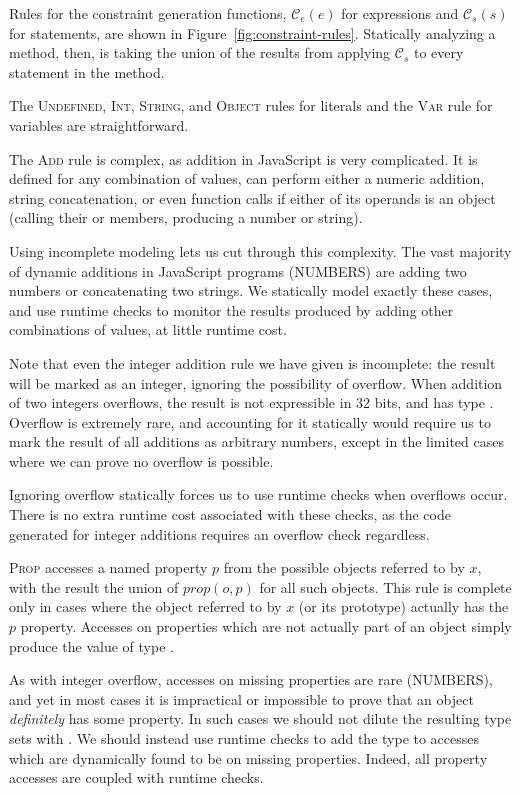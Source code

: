 Rules for the constraint generation functions, $\mathcal{C}_e(e)$ for
expressions and $\mathcal{C}_s(s)$ for statements, are shown in
Figure~\ref{fig:constraint-rules}. Statically analyzing a method, then, is
taking the union of the results from applying $\mathcal{C}_s$ to every
statement in the method.

The \textsc{Undefined}, \textsc{Int}, \textsc{String}, and \textsc{Object}
rules for literals and the \textsc{Var} rule for variables are
straightforward.

The \textsc{Add} rule is complex, as addition in JavaScript is very complicated. It is
defined for any combination of values, can perform either a numeric addition,
string concatenation, or even function calls if either of its operands is an
object (calling their  or  members, producing a
number or string).

Using incomplete modeling lets us cut through this complexity. The vast
majority of dynamic additions in JavaScript programs (NUMBERS) are adding two
numbers or concatenating two strings. We statically model exactly these cases,
and use runtime checks to monitor the results produced by adding other
combinations of values, at little runtime cost.

Note that even the integer addition rule we have given is incomplete: the
result will be marked as an integer, ignoring the possibility of
overflow. When addition of two integers overflows, the result is not
expressible in 32 bits, and has type . Overflow is extremely
rare, and accounting for it statically would require us to mark the result of
all additions as arbitrary numbers, except in the limited cases where we can
prove no overflow is possible.

Ignoring overflow statically forces us to use runtime checks when overflows
occur. There is no extra runtime cost associated with these checks, as the
code generated for integer additions requires an overflow check regardless.

\textsc{Prop} accesses a named property $p$ from the possible objects referred
to by $x$, with the result the union of $\mathit{prop}(o,p)$ for all such
objects.  This rule is complete only in cases where the object referred to by
$x$ (or its prototype) actually has the $p$ property.  Accesses on properties
which are not actually part of an object simply produce the 
value of type .

As with integer overflow, accesses on missing properties are rare (NUMBERS),
and yet in most cases it is impractical or impossible to prove that an object
\emph{definitely} has some property. In such cases we should not dilute the
resulting type sets with . We should instead use runtime
checks to add the  type to accesses which are dynamically
found to be on missing properties. Indeed, all property accesses are coupled
with runtime checks.

